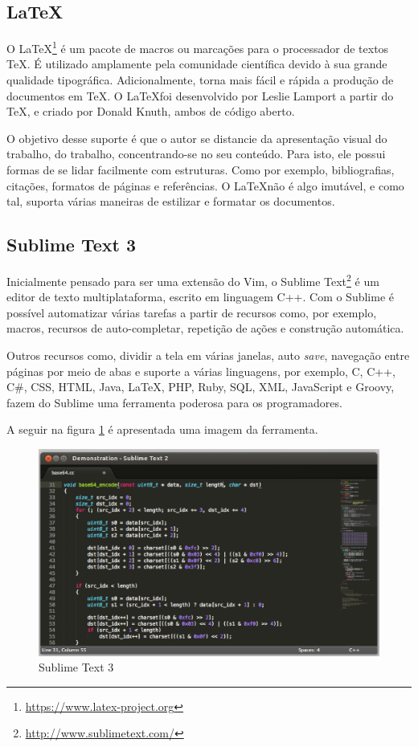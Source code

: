 \subsection{LaTeX}

O \LaTeX\footnote{\url{https://www.latex-project.org}} é um pacote de macros ou marcações para o processador de textos \TeX. É utilizado amplamente pela comunidade científica devido à sua grande qualidade tipográfica. Adicionalmente, torna mais fácil e rápida a produção de documentos em \TeX. O \LaTeX foi desenvolvido por Leslie Lamport a partir do \TeX, e criado por Donald Knuth, ambos de código aberto.

O objetivo desse suporte é que o autor se distancie da apresentação visual do trabalho, do trabalho, concentrando-se no seu conteúdo. Para isto, ele possui formas de se lidar facilmente com estruturas. Como por exemplo, bibliografias, citações, formatos de páginas e referências. O \LaTeX não é algo imutável, e como tal, suporta várias maneiras de estilizar e formatar os documentos.

\subsection{Sublime Text 3}

Inicialmente pensado para ser uma extensão do Vim, o Sublime Text\footnote{\url{http://www.sublimetext.com/}} é um editor de texto multiplataforma, escrito em linguagem C++. Com o Sublime é possível automatizar várias tarefas a partir de recursos como, por exemplo, macros, recursos de auto-completar, repetição de ações e construção automática.

Outros recursos como, dividir a tela em várias janelas, auto \textit{save}, navegação entre páginas por meio de abas e suporte a várias linguagens, por exemplo, C, C++, C\#, CSS, HTML, Java, \LaTeX, PHP, Ruby, SQL, XML, JavaScript e Groovy, fazem do Sublime uma ferramenta poderosa para os programadores.

A seguir na figura \ref{sublime} é apresentada uma imagem da ferramenta.

\begin{figure}[!h]
	\centering
	\includegraphics[scale=0.35]{figuras/capitulo3/sublime.eps}
	\caption{Sublime Text 3}
	\label{sublime}
\end{figure}

